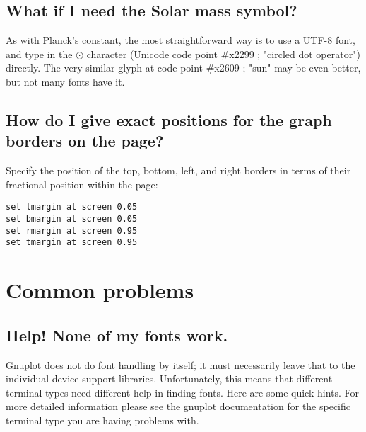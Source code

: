 \documentclass[a4paper,11pt]{article}
\begin{document}
\subsection{What if I need the Solar mass symbol?}

As with Planck's constant, the most straightforward way is to use a 
UTF-8 font, and type in the $\odot$ character (Unicode code point \#x2299 ; "circled dot operator") directly. 
The very similar glyph at code point \#x2609 ; "sun" may be even better, but not many fonts have it.
 

\subsection{How do I give exact positions for the graph borders on the page?}

Specify the position of the top, bottom, left, and right borders in
terms of their fractional position within the page:

\small
\begin{verbatim}
set lmargin at screen 0.05
set bmargin at screen 0.05
set rmargin at screen 0.95
set tmargin at screen 0.95
\end{verbatim}
\normalsize


\section{Common problems}


\subsection{Help! None of my fonts work.}

Gnuplot does not do font handling by itself; it must necessarily leave
that to the individual device support libraries. Unfortunately, this
means that different terminal types need different help in finding
fonts. Here are some quick hints. For more detailed information please
see the gnuplot documentation for the specific terminal type you are
having problems with.
\end{document}
